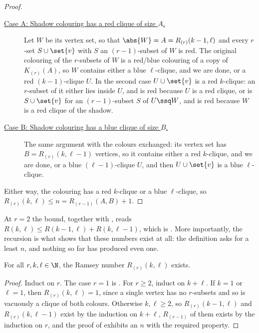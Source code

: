 \begin{proof}
    \begin{description}
        \item[\underline{Case A: Shadow colouring has a red clique of size $A$.}] Let $W$ be its vertex set, so that $\abs{W} = A = R_{(r)}(k - 1, \ell)$ and every $r$-set $S \cup \set{v}$ with $S$ an $(r - 1)$-subset of $W$ is red. The original colouring of the $r$-subsets of $W$ is a red/blue colouring of a copy of $K_{(r)}(A)$, so $W$ contains either a blue $\ell$-clique, and we are done, or a red $(k - 1)$-clique $U$. In the second case $U \cup \set{v}$ is a red $k$-clique: an $r$-subset of it either lies inside $U$, and is red because $U$ is a red clique, or is $S \cup \set{v}$ for an $(r - 1)$-subset $S$ of $U \ssq W$, and is red because $W$ is a red clique of the shadow.
        \item[\underline{Case B: Shadow colouring has a blue clique of size $B$.}] The same argument with the colours exchanged: its vertex set has $B = R_{(r)}(k, \ell - 1)$ vertices, so it contains either a red $k$-clique, and we are done, or a blue $(\ell - 1)$-clique $U$, and then $U \cup \set{v}$ is a blue $\ell$-clique.
    \end{description}

    Either way, the colouring has a red $k$-clique or a blue $\ell$-clique, so $R_{(r)}(k, \ell) \leq n = R_{(r - 1)}(A, B) + 1$.
\end{proof}

At $r = 2$ the bound, together with , reads $R(k, \ell) \leq R(k - 1, \ell) + R(k, \ell - 1)$, which is . More importantly, the recursion is what shows that these numbers exist at all: the definition asks for a least $n$, and nothing so far has produced even one.

\begin{boxcorollary} \label{Ch2:Cor:Hypergraph_Ramsey_Finite}
    For all $r, k, \ell \in \N$, the Ramsey number $R_{(r)}(k, \ell)$ exists.
\end{boxcorollary}
\begin{proof}
    Induct on $r$. The case $r = 1$ is . For $r \geq 2$, induct on $k + \ell$. If $k = 1$ or $\ell = 1$, then $R_{(r)}(k, \ell) = 1$, since a single vertex has no $r$-subsets and so is vacuously a clique of both colours. Otherwise $k, \ell \geq 2$, so $R_{(r)}(k - 1, \ell)$ and $R_{(r)}(k, \ell - 1)$ exist by the induction on $k + \ell$, $R_{(r - 1)}$ of them exists by the induction on $r$, and the proof of  exhibits an $n$ with the required property.
\end{proof}

